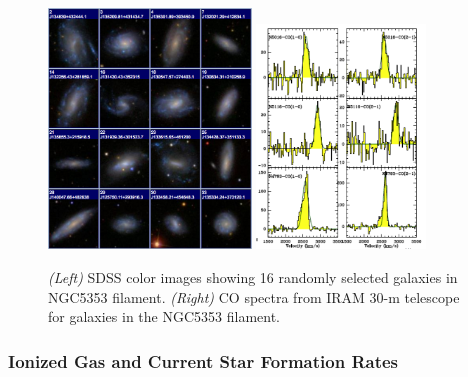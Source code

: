 \documentclass[12pt, preprint]{aastex}
\begin{document}
\begin{figure}[h]
\centering
\includegraphics[width=0.48\textwidth]{sdss-montage.png}
\includegraphics[width=0.4\textwidth]{CO-detection.png}
\caption{\small {\it (Left)} SDSS color images showing 16 randomly
  selected galaxies in NGC5353 filament.  {\it (Right)} CO spectra
  from IRAM 30-m telescope for galaxies in the NGC5353 filament.  }
\label{kimfigure}
\end{figure}


\subsubsection{Ionized Gas and Current Star Formation Rates}
\end{document}
